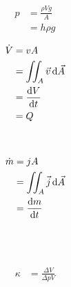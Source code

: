\begin{boxleft}
\\
\\
\\
\\
\end{boxleft}\begin{boxrightshaded}
\begin{align}
p&=\frac{\rho V g}{A}\\
&=h\rho g
\end{align}
\end{boxrightshaded}

\begin{boxleft}
\end{boxleft}\begin{boxrightshaded}
\begin{align}
\dot{V}&=v A\\
&=\iint_A \vec{v} \mathop{}\!\mathrm{d}\vec{ A}\\
&=\frac{\mathop{}\!\mathrm{d} V}{\mathop{}\!\mathrm{d} t}\\
&=Q
\end{align}
\end{boxrightshaded}

\begin{boxleft}
\\
\end{boxleft}\begin{boxrightshaded}
\begin{align}
\dot{m}&=jA\\
&=\iint_A \vec{j} \mathop{}\!\mathrm{d}\vec{A}\\
&=\frac{\mathop{}\!\mathrm{d} m}{\mathop{}\!\mathrm{d} t}
\end{align}
\end{boxrightshaded}

\begin{boxleft}
\\
\\
\end{boxleft}\begin{boxrightshaded}
\begin{align}
\kappa&=\frac{\Delta V}{\Delta p V}
\end{align}
\end{boxrightshaded}

